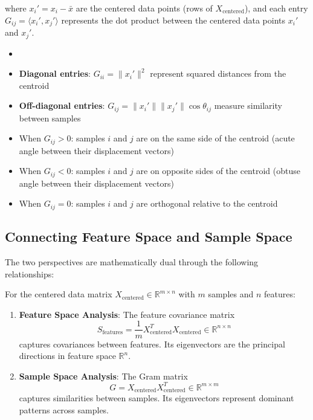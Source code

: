 \begin{notechapter}
where $x_i' = x_i - \bar{x}$ are the centered data points (rows of $X_{\text{centered}}$), and each entry $G_{ij} = \langle x_i', x_j' \rangle$ represents the dot product between the centered data points $x_i'$ and $x_j'$.

\begin{remark}
\begin{itemize}
    \item []
    \item \textbf{Diagonal entries}: $G_{ii} = \|x_i'\|^2$ represent squared distances from the centroid
    \item \textbf{Off-diagonal entries}: $G_{ij} = \|x_i'\|\|x_j'\|\cos\theta_{ij}$ measure similarity between samples
    \item When $G_{ij} > 0$: samples $i$ and $j$ are on the same side of the centroid (acute angle between their displacement vectors)
    \item When $G_{ij} < 0$: samples $i$ and $j$ are on opposite sides of the centroid (obtuse angle between their displacement vectors)
    \item When $G_{ij} = 0$: samples $i$ and $j$ are orthogonal relative to the centroid
\end{itemize}
\end{remark}

\subsection{Connecting Feature Space and Sample Space}

The two perspectives are mathematically dual through the following relationships:

\begin{theorem}
For the centered data matrix $X_{\text{centered}} \in \mathbb{R}^{m \times n}$ with $m$ samples and $n$ features:

\begin{enumerate}
    \item \textbf{Feature Space Analysis}: The feature covariance matrix 
    \[
    S_{\text{features}} = \frac{1}{m}X_{\text{centered}}^T X_{\text{centered}} \in \mathbb{R}^{n \times n}
    \]
    captures covariances between features. Its eigenvectors are the principal directions in feature space $\mathbb{R}^n$.

    \item \textbf{Sample Space Analysis}: The Gram matrix
    \[
    G = X_{\text{centered}} X_{\text{centered}}^T \in \mathbb{R}^{m \times m}
    \]
    captures similarities between samples. Its eigenvectors represent dominant patterns across samples.


\end{enumerate}
\end{theorem}
\end{notechapter}
